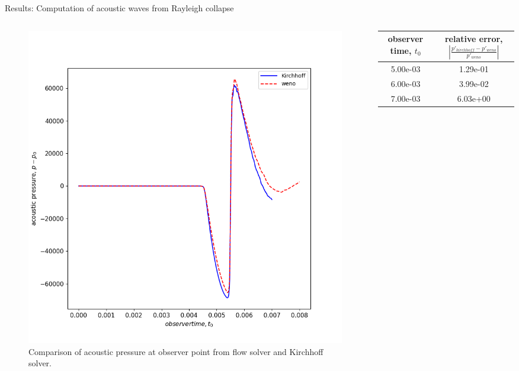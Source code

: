 \documentclass[10pt, aspectratio=169]{beamer}
\begin{document}
\begin{frame}{Results: Computation of acoustic waves from Rayleigh collapse}
	\begin{columns}
		\begin{column}{0.45\textwidth}
			\begin{figure}
				\centering
				\includegraphics[scale=0.3]{images/structured_pressure.png}
				\caption{Comparison of acoustic pressure at observer point from flow solver and Kirchhoff solver.}
			\end{figure}
		\end{column}
		\begin{column}{0.55\textwidth}
			\begin{tabular}{ |c|c| } 
				\hline
				observer time, $t_{0}$   & relative error, $|\frac{p'_{kirchhoff} - p'_{weno}}{p'_{weno}}|$  \\ 
				\hline
				5.00e-03  & 1.29e-01 \\
				6.00e-03  & 3.99e-02 \\
				7.00e-03 &  6.03e+00 \\
			
				\hline
			\end{tabular}
		\end{column}
	\end{columns}	
\end{frame}
\end{document}
